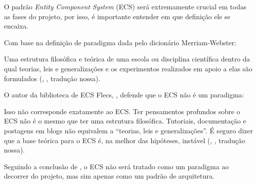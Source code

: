 O padrão \textit{Entity Component System} (ECS) será extremamente crucial em todas as fases do projeto, por isso, é importante entender em que definição ele se encaixa.

Com base na definição de paradigma dada pelo dicionário Merriam-Webster:

\begin{citacao}
	Uma estrutura filosófica e teórica de uma escola ou disciplina científica dentro da qual teorias, leis e generalizações e os experimentos realizados em apoio a elas são formulados (\citeauthor{merriamwebster}, \citeyear{merriamwebster}, tradução nossa).
\end{citacao}

O autor da biblioteca de ECS Flecs, , defende que o ECS não é um paradigma:

\begin{citacao}
	Isso não corresponde exatamente ao ECS. Ter pensamentos profundos sobre o ECS não é o mesmo que ter uma estrutura filosófica. Tutoriais, documentação e postagens em blogs não equivalem a “teorias, leis e generalizações”. É seguro dizer que a base teórica para o ECS é, na melhor das hipóteses, instável (\citeauthor{ecsparadigm}, \citeyear{ecsparadigm}, tradução nossa).
\end{citacao}

Seguindo a conclusão de , o ECS não será tratado como um paradigma ao decorrer do projeto, mas sim apenas como um padrão de arquitetura.
